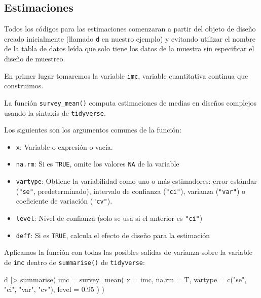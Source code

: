 \documentclass[
  spanish,
  a4paper,
]{scrbook}
\newenvironment{Shaded}{\begin{snugshade}}{\end{snugshade}}
\newcommand{\AttributeTok}[1]{\textcolor[rgb]{0.40,0.45,0.13}{#1}}
\newcommand{\FloatTok}[1]{\textcolor[rgb]{0.68,0.00,0.00}{#1}}
\newcommand{\FunctionTok}[1]{\textcolor[rgb]{0.28,0.35,0.67}{#1}}
\newcommand{\NormalTok}[1]{\textcolor[rgb]{0.00,0.23,0.31}{#1}}
\newcommand{\SpecialCharTok}[1]{\textcolor[rgb]{0.37,0.37,0.37}{#1}}
\newcommand{\StringTok}[1]{\textcolor[rgb]{0.13,0.47,0.30}{#1}}
\begin{document}
\subsection{Estimaciones}\label{estimaciones}

\begin{tcolorbox}[enhanced jigsaw, arc=.35mm, bottomrule=.15mm, breakable, colback=white, colframe=quarto-callout-warning-color-frame, left=2mm, leftrule=.75mm, opacityback=0, rightrule=.15mm, toprule=.15mm]

Todos los códigos para las estimaciones comenzaran a partir del objeto
de diseño creado inicialmente (llamado \texttt{d} en nuestro ejemplo) y
evitando utilizar el nombre de la tabla de datos leída que solo tiene
los datos de la muestra sin especificar el diseño de muestreo.

\end{tcolorbox}

En primer lugar tomaremos la variable \texttt{imc}, variable
cuantitativa continua que construimos.

La función \texttt{survey\_mean()} computa estimaciones de medias en
diseños complejos usando la sintaxis de \texttt{tidyverse}.

Los siguientes son los argumentos comunes de la función:

\begin{itemize}
\item
  \texttt{x}: Variable o expresión o vacía.
\item
  \texttt{na.rm}: Si es \texttt{TRUE}, omite los valores \texttt{NA} de
  la variable
\item
  \texttt{vartype}: Obtiene la variabilidad como uno o más estimadores:
  error estándar (\texttt{"se"}, predeterminado), intervalo de confianza
  (\texttt{"ci"}), varianza (\texttt{"var"}) o coeficiente de variación
  (\texttt{"cv"}).
\item
  \texttt{level}: Nivel de confianza (solo se usa si el anterior es
  \texttt{"ci"})
\item
  \texttt{deff}: Si es \texttt{TRUE}, calcula el efecto de diseño para
  la estimación
\end{itemize}

Aplicamos la función con todas las posibles salidas de varianza sobre la
variable de \texttt{imc} dentro de \texttt{summarise()} de
\texttt{tidyverse}:

\begin{Shaded}
\begin{Highlighting}[]
\NormalTok{d }\SpecialCharTok{|\textgreater{}}
  \FunctionTok{summarise}\NormalTok{(}
    \AttributeTok{imc =} \FunctionTok{survey\_mean}\NormalTok{(}
      \AttributeTok{x =}\NormalTok{ imc,}
      \AttributeTok{na.rm =}\NormalTok{ T,}
      \AttributeTok{vartype =} \FunctionTok{c}\NormalTok{(}\StringTok{"se"}\NormalTok{, }\StringTok{"ci"}\NormalTok{, }\StringTok{"var"}\NormalTok{, }\StringTok{"cv"}\NormalTok{),}
      \AttributeTok{level =} \FloatTok{0.95}
\NormalTok{    )}
\NormalTok{  )}
\end{Highlighting}
\end{Shaded}
\end{document}
